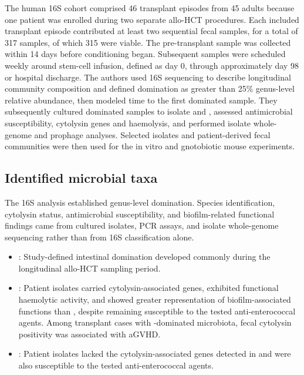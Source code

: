 \documentclass[11pt,a4paper]{article}
\begin{document}
The human 16S cohort comprised 46 transplant episodes from 45 adults because one patient was enrolled during two separate allo-HCT procedures. Each included transplant episode contributed at least two sequential fecal samples, for a total of 317 samples, of which 315 were viable. The pre-transplant sample was collected within 14 days before conditioning began. Subsequent samples were scheduled weekly around stem-cell infusion, defined as day 0, through approximately day 98 or hospital discharge. The authors used 16S sequencing to describe longitudinal community composition and defined \taxEnterococcus domination as greater than 25\% genus-level relative abundance, then modeled time to the first dominated sample. They subsequently cultured dominated samples to isolate \taxEfaecalis and \taxEfaecium, assessed antimicrobial susceptibility, cytolysin genes and haemolysis, and performed isolate whole-genome and prophage analyses. Selected isolates and patient-derived fecal communities were then used for the in vitro and gnotobiotic mouse experiments.

\subsection{Identified microbial taxa}
The 16S analysis established genus-level \taxEnterococcus domination. Species identification, cytolysin status, antimicrobial susceptibility, and biofilm-related functional findings came from cultured isolates, PCR assays, and isolate whole-genome sequencing rather than from 16S classification alone.

\begin{itemize}
    \item  \taxEnterococcus: Study-defined intestinal domination developed commonly during the longitudinal allo-HCT sampling period. 
    \item \taxEnterococcusFaecalis: Patient isolates carried cytolysin-associated genes, exhibited functional haemolytic activity, and showed greater representation of biofilm-associated functions than \taxEfaecium, despite remaining susceptible to the tested anti-enterococcal agents. Among transplant cases with \taxEnterococcus-dominated microbiota, fecal cytolysin positivity was associated with aGVHD. 
    \item \taxEnterococcusFaecium: Patient isolates lacked the cytolysin-associated genes detected in \taxEfaecalis and were also susceptible to the tested anti-enterococcal agents. 
\end{itemize}
\end{document}
